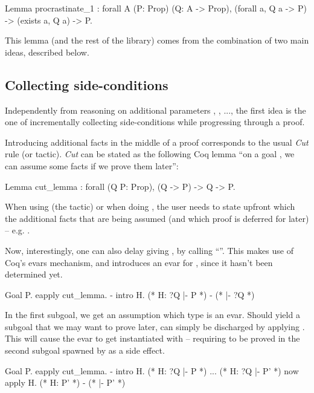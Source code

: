 \documentclass[xetex,format=acmlarge,screen=true,authorversion=true]{acmart-modified}
\begin{document}
\begin{coq}
  Lemma procrastinate_1 : forall A (P: Prop) (Q: A -> Prop),
    (forall a, Q a -> P) ->
    (exists a, Q a) ->
    P.
\end{coq}

This lemma (and the rest of the library) comes from the combination of two main
ideas, described below.

\subsection{Collecting side-conditions}

Independently from reasoning on additional parameters , , ...,
the first idea is the one of incrementally collecting side-conditions while
progressing through a proof.

Introducing additional facts in the middle of a proof corresponds to the usual
\emph{Cut} rule (or  tactic). \emph{Cut} can be stated as the following
Coq lemma ``on a goal , we can assume some facts  if we prove them
later'':

\begin{coq}
  Lemma cut_lemma : forall (Q P: Prop), (Q -> P) -> Q -> P.
\end{coq}

When using  (the tactic) or when doing , the user
needs to state upfront which the additional facts  that are being assumed
(and which proof is deferred for later) -- e.g. .

Now, interestingly, one can also delay giving , by calling ``''. This makes use of Coq's evars mechanism, and introduces an evar
for , since it hasn't been determined yet.

\begin{coq}
  Goal P.
    eapply cut_lemma.
    - intro H.
      (* H: ?Q |- P *)
    - (* |- ?Q *)
\end{coq}

In the first subgoal, we get an assumption  which type is an evar. Should
 yield a subgoal  that we may want to prove later,  can
simply be discharged by applying . This will cause the evar  to get
instantiated with  -- requiring  to be proved in the second
subgoal spawned by  as a side effect.

\begin{coq}
  Goal P.
    eapply cut_lemma.
    - intro H.
      (* H: ?Q |- P *)
      ...
      (* H: ?Q |- P' *)
      now apply H.
      (* H: P' *)
    - (* |- P' *)
\end{coq}
\end{document}
